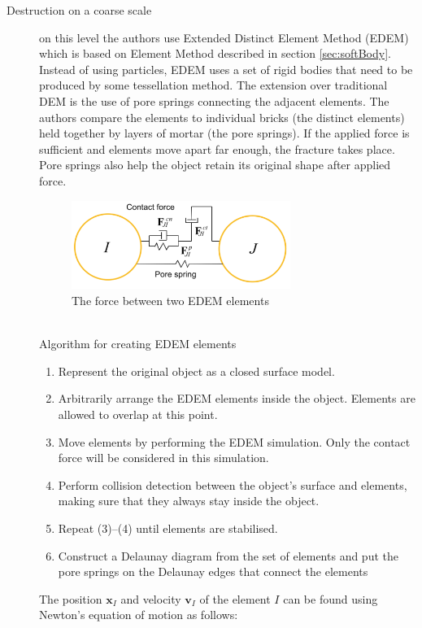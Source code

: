 \begin{description}
\item[Destruction on a coarse scale] on this level the authors use Extended Distinct Element Method (EDEM) which is based on Element Method described in section \ref{sec:softBody}. Instead of using particles, EDEM uses a set of rigid bodies that need to be produced by some tessellation method. The extension over traditional DEM is the use of pore springs connecting the adjacent elements. The authors compare the elements to individual bricks (the distinct elements) held together by layers of mortar (the pore springs). If the applied force is sufficient and elements move apart far enough, the fracture takes place. Pore springs also help the object retain its original shape after applied force.
\begin{figure}[ht!]
        \centering
        \includegraphics[width=0.7\textwidth]{img/spring}
        \caption{The force between two EDEM elements \cite{edem}}
        \label{spring}
\end{figure}
\\Algorithm for creating EDEM elements
\begin{enumerate}
\item Represent the original object as a closed surface model.
\item Arbitrarily arrange the EDEM elements inside the object.
Elements are allowed to overlap at this point.
\item Move elements by performing the EDEM simulation. Only the contact force will be considered in this simulation.
\item Perform collision detection between the object’s surface
and elements, making sure that they always
stay inside the object.
\item Repeat (3)–(4) until elements are stabilised.
\item Construct a Delaunay diagram from the set of elements
and put the pore springs on the Delaunay edges that connect
the elements
\end{enumerate}
The position $\mathbf{x}_I$ and velocity $\mathbf{v}_I$ of the element $\mathit{I}$ can be found using Newton’s equation of motion as follows:
 

\end{description}

